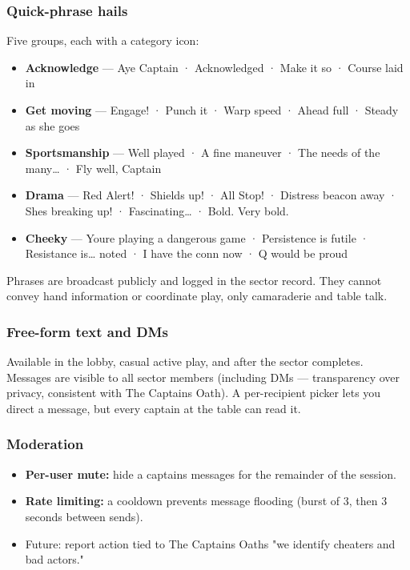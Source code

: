 \documentclass[11pt]{article}
\providecommand{\tightlist}{%
  \setlength{\itemsep}{0pt}\setlength{\parskip}{0pt}}
\begin{document}
\subsubsection{Quick-phrase hails}\label{quick-phrase-hails}

Five groups, each with a category icon:

\begin{itemize}
\tightlist
\item
  \textbf{Acknowledge} --- Aye Captain · Acknowledged · Make it so ·
  Course laid in
\item
  \textbf{Get moving} --- Engage! · Punch it · Warp speed · Ahead full ·
  Steady as she goes
\item
  \textbf{Sportsmanship} --- Well played · A fine maneuver · The needs
  of the many\ldots{} · Fly well, Captain
\item
  \textbf{Drama} --- Red Alert! · Shields up! · All Stop! · Distress
  beacon away · She\textquotesingle s breaking up! · Fascinating\ldots{}
  · Bold. Very bold.
\item
  \textbf{Cheeky} --- You\textquotesingle re playing a dangerous game ·
  Persistence is futile · Resistance is\ldots{} noted · I have the conn
  now · Q would be proud
\end{itemize}

Phrases are broadcast publicly and logged in the sector record. They
cannot convey hand information or coordinate play, only camaraderie and
table talk.

\subsubsection{Free-form text and DMs}\label{free-form-text-and-dms}

Available in the lobby, casual active play, and after the sector
completes. Messages are visible to all sector members (including DMs ---
transparency over privacy, consistent with The Captain\textquotesingle s
Oath). A per-recipient picker lets you direct a message, but every
captain at the table can read it.

\subsubsection{Moderation}\label{moderation}

\begin{itemize}
\tightlist
\item
  \textbf{Per-user mute:} hide a captain\textquotesingle s messages for
  the remainder of the session.
\item
  \textbf{Rate limiting:} a cooldown prevents message flooding (burst of
  3, then 3 seconds between sends).
\item
  Future: report action tied to The Captain\textquotesingle s
  Oath\textquotesingle s "we identify cheaters and bad actors."
\end{itemize}
\end{document}
